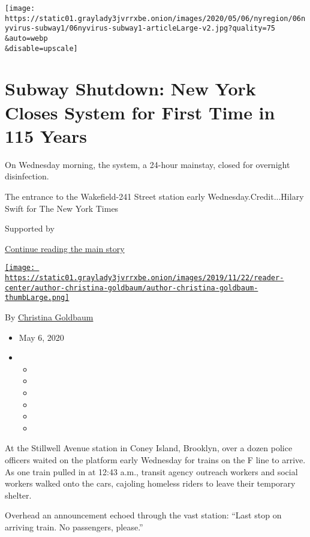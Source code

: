 \texttt{[image: https://static01.graylady3jvrrxbe.onion/images/2020/05/06/nyregion/06nyvirus-subway1/06nyvirus-subway1-articleLarge-v2.jpg?quality=75\\\&auto=webp\\\&disable=upscale]}

\hypertarget{subway-shutdown-new-york-closes-system-for-first-time-in-115-years}{%
\section{Subway Shutdown: New York Closes System for First Time in 115
Years}\label{subway-shutdown-new-york-closes-system-for-first-time-in-115-years}}

On Wednesday morning, the system, a 24-hour mainstay, closed for
overnight disinfection.

The entrance to the Wakefield-241 Street station early
Wednesday.Credit...Hilary Swift for The New York Times

Supported by

\protect\hyperlink{after-sponsor}{Continue reading the main story}

\href{https://www.nytimes3xbfgragh.onion/by/christina-goldbaum}{\texttt{[image: https://static01.graylady3jvrrxbe.onion/images/2019/11/22/reader-center/author-christina-goldbaum/author-christina-goldbaum-thumbLarge.png]}}

By
\href{https://www.nytimes3xbfgragh.onion/by/christina-goldbaum}{Christina
Goldbaum}

\begin{itemize}
\item
  May 6, 2020
\item
  \begin{itemize}
  \item
  \item
  \item
  \item
  \item
  \item
  \end{itemize}
\end{itemize}

At the Stillwell Avenue station in Coney Island, Brooklyn, over a dozen
police officers waited on the platform early Wednesday for trains on the
F line to arrive. As one train pulled in at 12:43 a.m., transit agency
outreach workers and social workers walked onto the cars, cajoling
homeless riders to leave their temporary shelter.

Overhead an announcement echoed through the vast station: ``Last stop on
arriving train. No passengers, please.''

